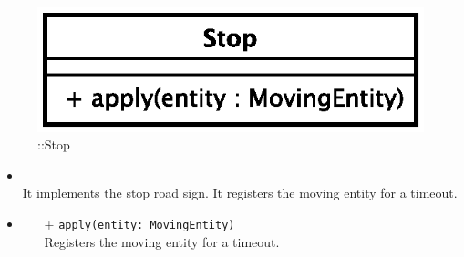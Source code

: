 \begin{figure}[h]
\centering
\includegraphics[scale=0.6,keepaspectratio]{images/solution/stop.eps}
\caption{\pPassive::Stop}
\label{fig:sd-app-stop}
\end{figure}
\FloatBarrier
\begin{itemize}
  \item \textbf{\descr} \\
It implements the stop road sign. It registers the moving entity for a timeout.
  \item \textbf{\ops}
  \begin{itemize} 
  \item[+] \texttt{apply(entity: MovingEntity)} \\
Registers the moving entity for a timeout.
  \end{itemize}
\end{itemize}
